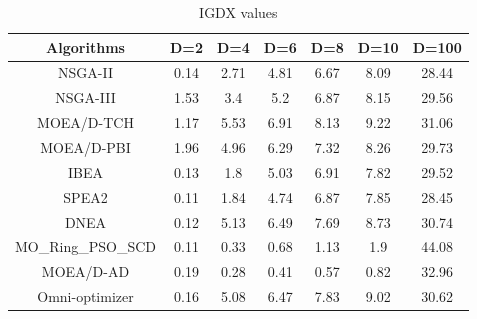 \documentclass[conference]{IEEEtran}
\begin{document}
\begin{table}[htbp]
\begin{tabular}{@{}ccccccc@{}}
\toprule
Algorithms      & D=2                          & D=4                          & D=6                          & D=8                          & D=10                         & D=100                         \\ \midrule
NSGA-II         & 0.14                         & 2.71                         & 4.81                         & 6.67                         & 8.09                         & 28.44                         \\
NSGA-III        & 1.53                         & 3.4                          & 5.2                          & 6.87                         & 8.15                         & 29.56                         \\
MOEA/D-TCH      & 1.17                         & 5.53                         & 6.91                         & 8.13                         & 9.22                         & 31.06                         \\
MOEA/D-PBI      & 1.96                         & 4.96                         & 6.29                         & 7.32                         & 8.26                         & 29.73                         \\
IBEA            & 0.13                         & 1.8                          & 5.03                         & 6.91                         & 7.82                         & 29.52                         \\
SPEA2           & \cellcolor[HTML]{F8FF00}0.11 & 1.84                         & 4.74                         & 6.87                         & 7.85                         & \cellcolor[HTML]{F8FF00}28.45 \\
DNEA            & 0.12                         & 5.13                         & 6.49                         & 7.69                         & 8.73                         & 30.74                         \\
\cellcolor[HTML]{F8FF00}MO\_Ring\_PSO\_SCD & \cellcolor[HTML]{F8FF00}0.11 & 0.33                         & 0.68                         & 1.13                         & 1.9                          & 44.08                         \\
\cellcolor[HTML]{F8FF00}MOEA/D-AD       & 0.19                         & \cellcolor[HTML]{F8FF00}0.28 & \cellcolor[HTML]{F8FF00}0.41 & \cellcolor[HTML]{F8FF00}0.57 & \cellcolor[HTML]{F8FF00}0.82 & 32.96                         \\
Omni-optimizer  & 0.16                         & 5.08                         & 6.47                         & 7.83                         & 9.02                         & 30.62                         \\ \bottomrule
\end{tabular}
\caption{IGDX values}
\label{table: IGDX sumup}
\end{table}
\end{document}
